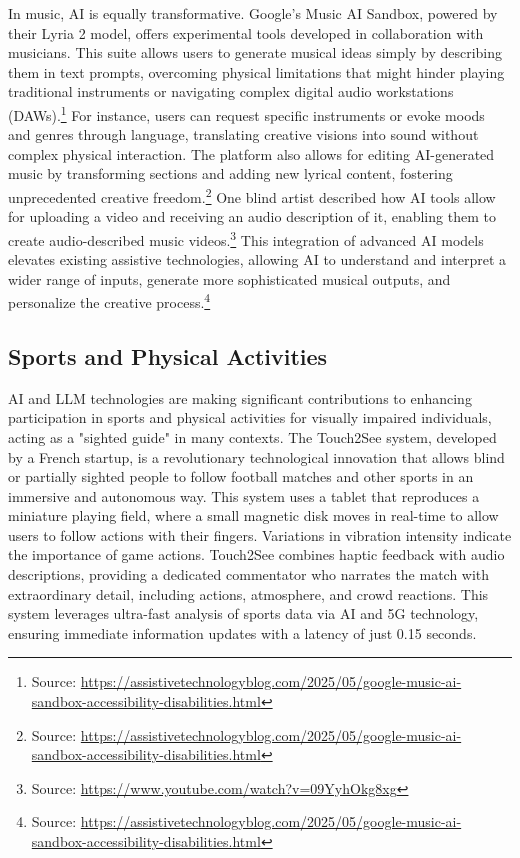 In music, AI is equally transformative. Google's Music AI Sandbox, powered by their Lyria 2 model, offers experimental tools developed in collaboration with musicians. This suite allows users to generate musical ideas simply by describing them in text prompts, overcoming physical limitations that might hinder playing traditional instruments or navigating complex digital audio workstations (DAWs).\footnote{Source: \url{https://assistivetechnologyblog.com/2025/05/google-music-ai-sandbox-accessibility-disabilities.html}} For instance, users can request specific instruments or evoke moods and genres through language, translating creative visions into sound without complex physical interaction. The platform also allows for editing AI-generated music by transforming sections and adding new lyrical content, fostering unprecedented creative freedom.\footnote{Source: \url{https://assistivetechnologyblog.com/2025/05/google-music-ai-sandbox-accessibility-disabilities.html}} One blind artist described how AI tools allow for uploading a video and receiving an audio description of it, enabling them to create audio-described music videos.\footnote{Source: \url{https://www.youtube.com/watch?v=09YyhOkg8xg}} This integration of advanced AI models elevates existing assistive technologies, allowing AI to understand and interpret a wider range of inputs, generate more sophisticated musical outputs, and personalize the creative process.\footnote{Source: \url{https://assistivetechnologyblog.com/2025/05/google-music-ai-sandbox-accessibility-disabilities.html}}

\subsection{Sports and Physical Activities}

AI and LLM technologies are making significant contributions to enhancing participation in sports and physical activities for visually impaired individuals, acting as a "sighted guide" in many contexts. \cite{lexgillette2024} The Touch2See system, developed by a French startup, is a revolutionary technological innovation that allows blind or partially sighted people to follow football matches and other sports in an immersive and autonomous way. This system uses a tablet that reproduces a miniature playing field, where a small magnetic disk moves in real-time to allow users to follow actions with their fingers. Variations in vibration intensity indicate the importance of game actions. Touch2See combines haptic feedback with audio descriptions, providing a dedicated commentator who narrates the match with extraordinary detail, including actions, atmosphere, and crowd reactions. This system leverages ultra-fast analysis of sports data via AI and 5G technology, ensuring immediate information updates with a latency of just 0.15 seconds. \cite{embedded2024}

